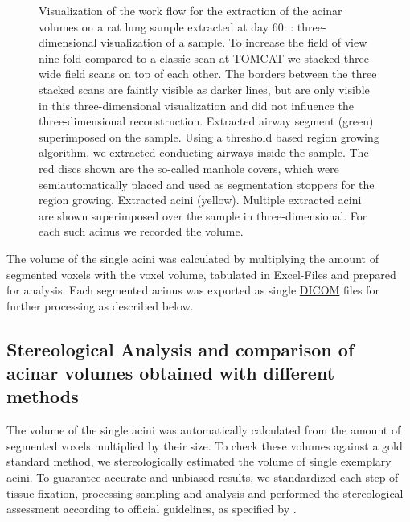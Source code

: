 \documentclass[%
	draft,
	paper=a4,%
	abstract=true,%
	]{scrartcl}
\newlength\imagescale		%
\begin{document}
\begin{figure}
{%
		\label{subfig:extracted acini}%
		}
	\caption{Visualization of the work flow for the extraction of the acinar volumes on a rat lung sample extracted at day 60: %
		: three-dimensional visualization of a sample. To increase the field of view nine-fold compared to a classic scan at TOMCAT we stacked three wide field scans on top of each other. The borders between the three stacked scans are faintly visible as darker lines, but are only visible in this three-dimensional visualization and did not influence the three-dimensional reconstruction. %
		 Extracted airway segment (green) superimposed on the sample. Using a threshold based region growing algorithm, we extracted conducting airways inside the sample. The red discs shown are the so-called manhole covers, which were semiautomatically placed and used as segmentation stoppers for the region growing. %
		 Extracted acini (yellow). Multiple extracted acini are shown superimposed over the sample in three-dimensional. For each such acinus we recorded the volume.%
		}
	\label{fig:workflow}
\end{figure}

The volume of the single acini was calculated by multiplying the amount of segmented voxels with the voxel volume, tabulated in Excel-Files and prepared for analysis. Each segmented acinus was exported as single \href{https://secure.wikimedia.org/wikipedia/en/w/index.php?title=Digital_Imaging_and_Communications_in_Medicine&oldid=415023605}{DICOM} files for further processing as described below.

\subsection{Stereological Analysis and comparison of acinar volumes obtained with different methods}
The volume of the single acini was automatically calculated from the amount of segmented voxels multiplied by their size. To check these volumes against a gold standard method, we stereologically estimated the volume of single exemplary acini. To guarantee accurate and unbiased results, we standardized each step of tissue fixation, processing sampling and analysis and performed the stereological assessment according to official guidelines, as specified by \citet{Hsia2010}.
\end{document}
